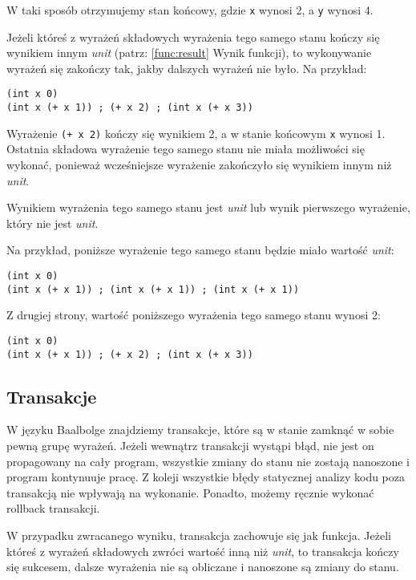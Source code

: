 \documentclass{article}
\begin{document}
W taki sposób otrzymujemy stan końcowy, gdzie \texttt{x} wynosi 2, a \texttt{y} wynosi 4.

Jeżeli któreś z wyrażeń składowych wyrażenia tego samego stanu kończy się wynikiem innym \textit{unit} (patrz: \ref{func:result} Wynik funkcji), to wykonywanie wyrażeń się zakończy tak, jakby dalszych wyrażeń nie było. Na przykład:

\begin{lstlisting}
(int x 0)
(int x (+ x 1)) ; (+ x 2) ; (int x (+ x 3))
\end{lstlisting}

Wyrażenie \texttt{(+ x 2)} kończy się wynikiem 2, a w stanie końcowym \texttt{x} wynosi 1. Ostatnia składowa wyrażenie tego samego stanu nie miała możliwości się wykonać, ponieważ wcześniejsze wyrażenie zakończyło się wynikiem innym niż \textit{unit}.

Wynikiem wyrażenia tego samego stanu jest \textit{unit} lub wynik pierwszego wyrażenie, który nie jest \textit{unit}.

Na przykład, poniższe wyrażenie tego samego stanu będzie miało wartość \textit{unit}:

\begin{lstlisting}
(int x 0)
(int x (+ x 1)) ; (int x (+ x 1)) ; (int x (+ x 1))
\end{lstlisting}

Z drugiej strony, wartość poniższego wyrażenia tego samego stanu wynosi 2:

\begin{lstlisting}
(int x 0)
(int x (+ x 1)) ; (+ x 2) ; (int x (+ x 3))
\end{lstlisting}

\subsection{Transakcje}\label{trans}

W języku Baalbolge znajdziemy transakcje, które są w stanie zamknąć w sobie pewną grupę wyrażeń. Jeżeli wewnątrz transakcji wystąpi błąd, nie jest on propagowany na cały program, wszystkie zmiany do stanu nie zostają nanoszone i program kontynuuje pracę. Z koleji wszystkie błędy statycznej analizy kodu poza transakcją nie wpływają na wykonanie. Ponadto, możemy ręcznie wykonać rollback transakcji.

W przypadku zwracanego wyniku, transakcja zachowuje się jak funkcja. Jeżeli któreś z wyrażeń składowych zwróci wartość inną niż \textit{unit}, to transakcja kończy się sukcesem, dalsze wyrażenia nie są obliczane i nanoszone są zmiany do stanu.
\end{document}

